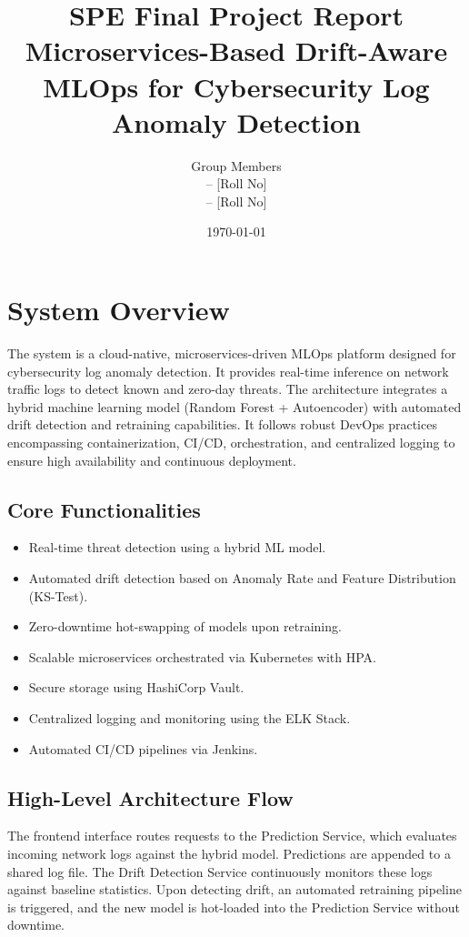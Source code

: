\documentclass[12pt]{article}
\title{\textbf{SPE Final Project Report} \\ Microservices-Based Drift-Aware MLOps for Cybersecurity Log Anomaly Detection}
\author{Group Members \\ [Your Name] – [Roll No] \\ [Team Member 2] – [Roll No]}
\date{\today}
\begin{document}
\maketitle

\tableofcontents
\newpage

\section{System Overview}
The system is a cloud-native, microservices-driven MLOps platform designed for cybersecurity log anomaly detection. It provides real-time inference on network traffic logs to detect known and zero-day threats. The architecture integrates a hybrid machine learning model (Random Forest + Autoencoder) with automated drift detection and retraining capabilities. It follows robust DevOps practices encompassing containerization, CI/CD, orchestration, and centralized logging to ensure high availability and continuous deployment.

\subsection{Core Functionalities}
\begin{itemize}
    \item Real-time threat detection using a hybrid ML model.
    \item Automated drift detection based on Anomaly Rate and Feature Distribution (KS-Test).
    \item Zero-downtime hot-swapping of models upon retraining.
    \item Scalable microservices orchestrated via Kubernetes with HPA.
    \item Secure storage using HashiCorp Vault.
    \item Centralized logging and monitoring using the ELK Stack.
    \item Automated CI/CD pipelines via Jenkins.
\end{itemize}

\subsection{High-Level Architecture Flow}
The frontend interface routes requests to the Prediction Service, which evaluates incoming network logs against the hybrid model. Predictions are appended to a shared log file. The Drift Detection Service continuously monitors these logs against baseline statistics. Upon detecting drift, an automated retraining pipeline is triggered, and the new model is hot-loaded into the Prediction Service without downtime.
\end{document}
